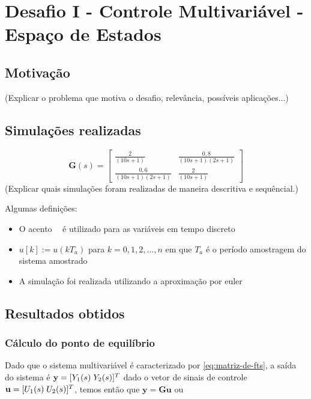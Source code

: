 \section{Desafio I - Controle Multivariável - Espaço de Estados}

\subsection{Motivação}
(Explicar o problema que motiva o desafio, relevância, possíveis aplicações...)

\subsection{Simulações realizadas}

\begin{equation}
    \label{eq:matriz-de-fts}
    \mathbf{G}(s) =
    \begin{bmatrix}
        \frac{2}{(10s+1)}         & \frac{0,8}{(10s+1)(2s+1)} \\
        \frac{0,6}{(10s+1)(2s+1)} & \frac{2}{(10s+1)}
    \end{bmatrix}
\end{equation}
(Explicar quais simulações foram realizadas de maneira descritiva e sequêncial.)

Algumas definições:

\begin{itemize}
    \item O acento \textbf{~} é utilizado para as variáveis em tempo discreto
    \item $u[k] := u(kT_a)$ para $k = 0, 1, 2, ..., n$ em que $T_a$ é o período
          amostragem do sistema amostrado
    \item A simulação foi realizada utilizando a aproximação por euler
\end{itemize}


\subsection{Resultados obtidos}
\label{sub:resultados-obtidos-desafio6}

\subsubsection{Cálculo do ponto de equilíbrio}
\label{subsub:calculo-do-ponto-de-equilibrio}
Dado que o sistema multivariável é caracterizado por \ref{eq:matriz-de-fts}, a
saída do sistema é $\mathbf{y} = [Y_1(s) \thickspace Y_2(s)]^{T}$ dado o vetor de
sinais de controle $\mathbf{u} = [U_1(s) \thickspace U_2(s)]^{T}$, temos então que
$\mathbf{y} = \mathbf{G}\mathbf{u}$ ou


